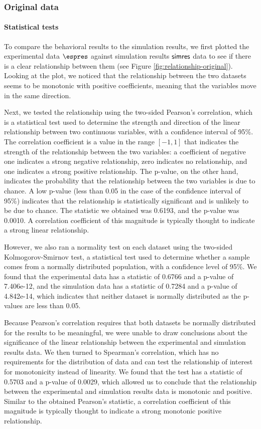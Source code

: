 \subsubsection{Original data}

\paragraph{Statistical tests}

To compare the behavioral results to the simulation results, we first plotted the experimental data $\espres$ against simulation results $\mathsf{simres}$ data to see if there is a clear relationship between them (see Figure \ref{fig:relationship-original}). Looking at the plot, we noticed that the relationship between the two datasets seems to be monotonic with positive coefficients, meaning that the variables move in the same direction.

Next, we tested the relationship using the two-sided Pearson's correlation, which is a statistical test used to determine the strength and direction of the linear relationship between two continuous variables, with a confidence interval of 95\%. The correlation coefficient is a value in the range $[-1, 1]$ that indicates the strength of the relationship between the two variables: a coefficient of negative one indicates a strong negative relationship, zero indicates no relationship, and one indicates a strong positive relationship. The p-value, on the other hand, indicates the probability that the relationship between the two variables is due to chance. A low p-value (less than 0.05 in the case of the confidence interval of 95\%) indicates that the relationship is statistically significant and is unlikely to be due to chance.
The statistic we obtained was 0.6193, and the p-value was 0.0010. A correlation coefficient of this magnitude is typically thought to indicate a strong linear relationship.

However, we also ran a normality test on each dataset using the two-sided Kolmogorov-Smirnov test, a statistical test used to determine whether a sample comes from a normally distributed population, with a confidence level of 95\%. We found that the experimental data has a statistic of 0.6766 and a p-value of 7.406e-12, and the simulation data has a statistic of 0.7284 and a p-value of 4.842e-14, which indicates that neither dataset is normally distributed as the p-values are less than 0.05.

Because Pearson's correlation requires that both datasets be normally distributed for the results to be meaningful, we were unable to draw conclusions about the significance of the linear relationship between the experimental and simulation results data. We then turned to Spearman's correlation, which has no requirements for the distribution of data and can test the relationship of interest for monotonicity instead of linearity. 
We found that the test has a statistic of 0.5703 and a p-value of 0.0029, which allowed us to conclude that the relationship between the experimental and simulation results data is monotonic and positive. Similar to the obtained Pearson's statistic, a correlation coefficient of this magnitude is typically thought to indicate a strong monotonic positive relationship.

